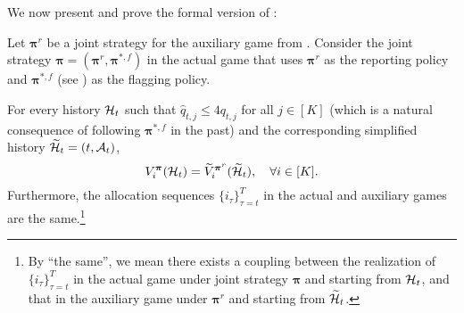 We now present and prove the formal version of :
\begin{lemma}\label{lem:equiv between actual and no-flagging formal}
Let ${\bm \pi}^r$ be a joint strategy for the auxiliary game from .
Consider the joint strategy $\bm \pi=({\bm \pi}^r,{\bm \pi}^{\ast,f})$ in the actual game that uses ${\bm \pi}^r$ as the reporting policy and ${\bm \pi}^{\ast,f}$ (see ) as the flagging policy.

For every history $\mathcal{H}_t$ such that $\hat q_{t,j}\le 4q_{t,j}$ for all $j\in [K]$ (which is a natural consequence of following ${\bm \pi}^{\ast,f}$ in the past) and the corresponding simplified history $\widetilde {\mathcal{H}}_t=(t,\mathcal{A}_t)$,
\begin{equation}\label{eq:equiv between actual and no-flagging}
V_i^{\bm \pi}(\mathcal{H}_{t})=\widetilde V_i^{{\bm \pi}^r}(\widetilde {\mathcal{H}}_t),\quad \forall i\in [K].
\end{equation}
Furthermore, the allocation sequences $\{i_{\tau}\}_{\tau=t}^T$ in the actual and auxiliary games are the same.\footnote{By ``the same'', we mean there exists a coupling between the realization of $\{i_{\tau}\}_{\tau=t}^T$ in the actual game under joint strategy $\bm \pi$ and starting from $\mathcal{H}_t$, and that in the auxiliary game under ${\bm \pi}^r$ and starting from $\widetilde {\mathcal{H}}_t$.}
\end{lemma}
